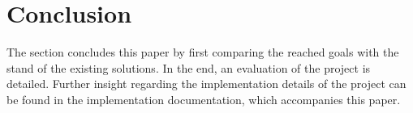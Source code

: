 \section{Conclusion}
The section concludes this paper by first comparing the reached goals with the stand of the existing solutions. In the end, an evaluation of the project is detailed. Further insight regarding the implementation details of the project can be found in the implementation documentation, which accompanies this paper. 

